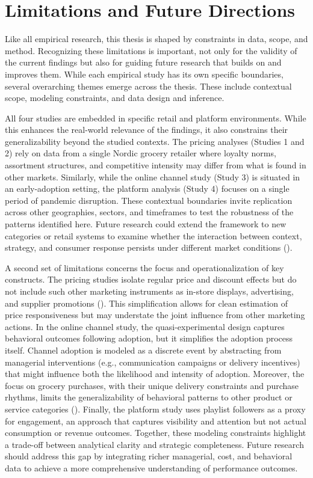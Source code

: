 \section{Limitations and Future Directions}

Like all empirical research, this thesis is shaped by constraints in data, scope, and method. Recognizing these limitations is important, not only for the validity of the current findings but also for guiding future research that builds on and improves them. While each empirical study has its own specific boundaries, several overarching themes emerge across the thesis. These include contextual scope, modeling constraints, and data design and inference.

All four studies are embedded in specific retail and platform environments. While this enhances the real-world relevance of the findings, it also constrains their generalizability beyond the studied contexts. The pricing analyses (Studies 1 and 2) rely on data from a single Nordic grocery retailer where loyalty norms, assortment structures, and competitive intensity may differ from what is found in other markets. Similarly, while the online channel study (Study 3) is situated in an early-adoption setting, the platform analysis (Study 4) focuses on a single period of pandemic disruption. These contextual boundaries invite replication across other geographies, sectors, and timeframes to test the robustness of the patterns identified here. Future research could extend the framework to new categories or retail systems to examine whether the interaction between context, strategy, and consumer response persists under different market conditions (\cite{Gielens2019-si}).

A second set of limitations concerns the focus and operationalization of key constructs. The pricing studies isolate regular price and discount effects but do not include such other marketing instruments as in-store displays, advertising, and supplier promotions (\cite{Bijmolt2005-kg,Nijs2001-qq}). This simplification allows for clean estimation of price responsiveness but may understate the joint influence from other marketing actions. In the online channel study, the quasi-experimental design captures behavioral outcomes following adoption, but it simplifies the adoption process itself. Channel adoption is modeled as a discrete event by abstracting from managerial interventions (e.g., communication campaigns or delivery incentives) that might influence both the likelihood and intensity of adoption. Moreover, the focus on grocery purchases, with their unique delivery constraints and purchase rhythms, limits the generalizability of behavioral patterns to other product or service categories (\cite{Campo2020-xu,Kushwaha2013-iu}). Finally, the platform study uses playlist followers as a proxy for engagement, an approach that captures visibility and attention but not actual consumption or revenue outcomes. Together, these modeling constraints highlight a trade-off between analytical clarity and strategic completeness. Future research should address this gap by integrating richer managerial, cost, and behavioral data to achieve a more comprehensive understanding of performance outcomes.

